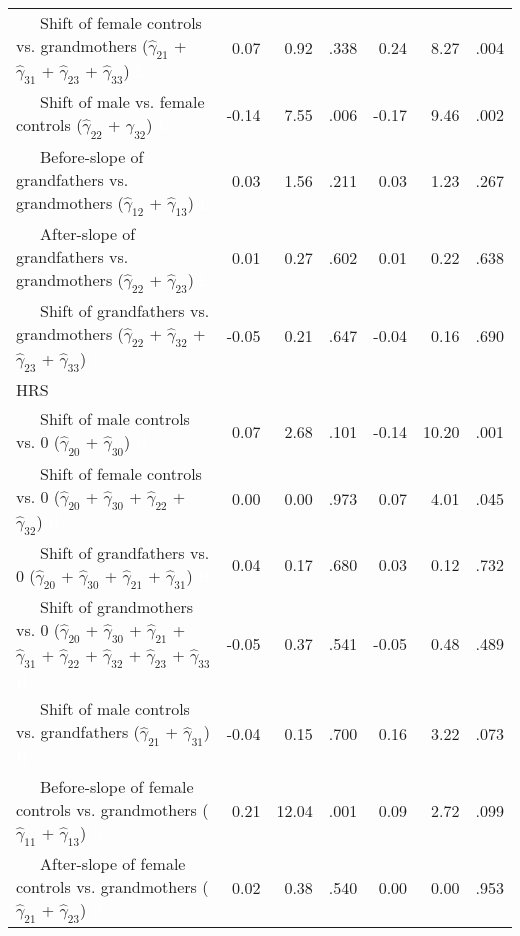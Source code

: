 \documentclass[
  english,
  man, noextraspace]{apa7}
\newenvironment{lltable}{\begin{landscape}\begin{center}\begin{ThreePartTable}}{\end{ThreePartTable}\end{center}\end{landscape}}
\begin{document}
\begin{appendix}
\begin{lltable}
{\begin{longtable}{lrrrrrr}
\ \ \ Shift of female controls vs. grandmothers 
($\hat{\gamma}_{21}$ + $\hat{\gamma}_{31}$ + 
$\hat{\gamma}_{23}$ + $\hat{\gamma}_{33}$) \textcolor{white}{L} & 0.07 & 0.92 & .338 & 0.24 & 8.27 & .004\\
\ \ \ Shift of male vs. female controls 
($\hat{\gamma}_{22}$ + $\hat{\gamma}_{32}$) \textcolor{white}{L} & -0.14 & 7.55 & .006 & -0.17 & 9.46 & .002\\
\ \ \ Before-slope of grandfathers vs. grandmothers 
($\hat{\gamma}_{12}$ + $\hat{\gamma}_{13}$) \textcolor{white}{L} & 0.03 & 1.56 & .211 & 0.03 & 1.23 & .267\\
\ \ \ After-slope of grandfathers vs. grandmothers 
($\hat{\gamma}_{22}$ + $\hat{\gamma}_{23}$) \textcolor{white}{L} & 0.01 & 0.27 & .602 & 0.01 & 0.22 & .638\\
\ \ \ Shift of grandfathers vs. grandmothers 
($\hat{\gamma}_{22}$ + $\hat{\gamma}_{32}$ + 
$\hat{\gamma}_{23}$ + $\hat{\gamma}_{33}$) \textcolor{white}{L} & -0.05 & 0.21 & .647 & -0.04 & 0.16 & .690\\
HRS &  &  &  &  &  & \\
\ \ \ Shift of male controls vs. 0 ($\hat{\gamma}_{20}$ + 
$\hat{\gamma}_{30}$) \textcolor{white}{H} & 0.07 & 2.68 & .101 & -0.14 & 10.20 & .001\\
\ \ \ Shift of female controls vs. 0 ($\hat{\gamma}_{20}$ + 
$\hat{\gamma}_{30}$ + $\hat{\gamma}_{22}$ + 
$\hat{\gamma}_{32}$) \textcolor{white}{H} & 0.00 & 0.00 & .973 & 0.07 & 4.01 & .045\\
\ \ \ Shift of grandfathers vs. 0 ($\hat{\gamma}_{20}$ + 
$\hat{\gamma}_{30}$ + $\hat{\gamma}_{21}$ + 
$\hat{\gamma}_{31}$) \textcolor{white}{H} & 0.04 & 0.17 & .680 & 0.03 & 0.12 & .732\\
\ \ \ Shift of grandmothers vs. 0 ($\hat{\gamma}_{20}$ + 
$\hat{\gamma}_{30}$ + $\hat{\gamma}_{21}$ + 
$\hat{\gamma}_{31}$ + $\hat{\gamma}_{22}$ + 
$\hat{\gamma}_{32}$ + $\hat{\gamma}_{23}$ +
$\hat{\gamma}_{33}$ \textcolor{white}{H} & -0.05 & 0.37 & .541 & -0.05 & 0.48 & .489\\
\ \ \ Shift of male controls vs. grandfathers 
($\hat{\gamma}_{21}$ + $\hat{\gamma}_{31}$) \textcolor{white}{H} & -0.04 & 0.15 & .700 & 0.16 & 3.22 & .073\\
\ \ \ Before-slope of female controls vs. grandmothers 
($\hat{\gamma}_{11}$ + $\hat{\gamma}_{13}$) \textcolor{white}{H} & 0.21 & 12.04 & .001 & 0.09 & 2.72 & .099\\
\ \ \ After-slope of female controls vs. grandmothers 
($\hat{\gamma}_{21}$ + $\hat{\gamma}_{23}$) \textcolor{white}{H} & 0.02 & 0.38 & .540 & 0.00 & 0.00 & .953\\

\end{longtable}}
\end{lltable}
\end{appendix}
\end{document}
